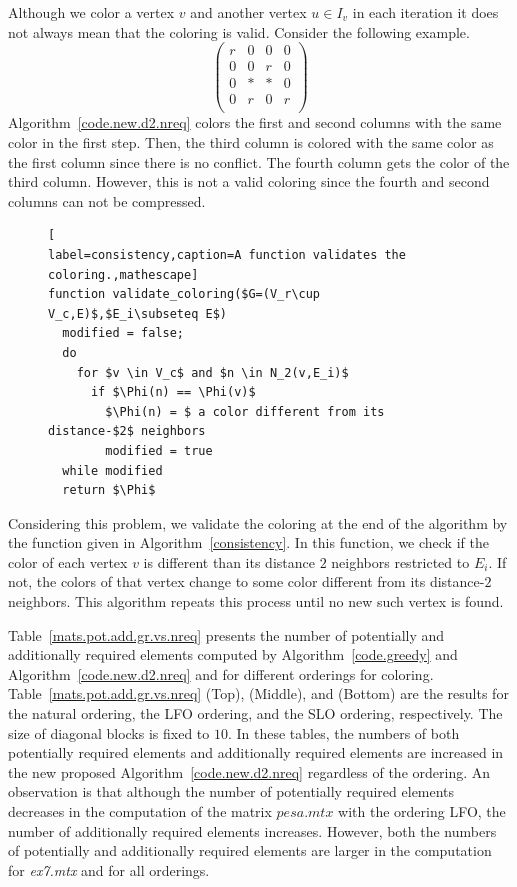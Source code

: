 \documentclass[12pt, twoside,a4paper,toc=bibliography]{scrbook}
\newcommand{\coderef}[1]{Algorithm~\protect\ref{#1}}
\begin{document}
Although we color a vertex $v$ and another vertex $u\in I_v$ in each iteration
it does not always mean that the coloring is valid. Consider the following example.
\begin{equation}
\left(\begin{array}{cccc}
r & 0 & 0 & 0  \\
0 & 0 & r & 0 \\
0 & * & * & 0 \\
0 & r & 0 & r \\
\end{array}\right)
\label{twocolorings2}
\end{equation}
\coderef{code.new.d2.nreq} colors the first and second columns with the same color
in the first step. Then, the third column is colored with the same color as the
first column since there is no conflict. The fourth column gets the color of
the third column. However, this is not a valid coloring
since the fourth and second columns can not be compressed.
\begin{figure}
\begin{lstlisting}[
label=consistency,caption=A function validates the coloring.,mathescape]
function validate_coloring($G=(V_r\cup V_c,E)$,$E_i\subseteq E$)
  modified = false;
  do
    for $v \in V_c$ and $n \in N_2(v,E_i)$
      if $\Phi(n) == \Phi(v)$
        $\Phi(n) = $ a color different from its distance-$2$ neighbors
        modified = true
  while modified
  return $\Phi$
\end{lstlisting}
\end{figure}
Considering this problem, we validate the coloring at the end of the algorithm
by the function given in \coderef{consistency}.
In this function, we check if the color of each vertex $v$ is different than its distance $2$ neighbors restricted
 to $E_i$.
If not, the colors of that vertex change to some color different from its distance-$2$ neighbors.
This algorithm repeats this process until no new such vertex is found.

Table~\ref{mats.pot.add.gr.vs.nreq} presents the number of potentially
and additionally required elements computed
by \coderef{code.greedy} and \coderef{code.new.d2.nreq}
and for different orderings for coloring.
Table~\ref{mats.pot.add.gr.vs.nreq} (Top), (Middle), and (Bottom) are
the results for the natural ordering, the LFO ordering, and the SLO ordering, respectively.
The size of diagonal blocks is fixed to $10$.
In these tables, the numbers of both potentially required elements and additionally required elements 
are increased in the new proposed \coderef{code.new.d2.nreq} regardless of the ordering.
An observation is that although the number of potentially required elements decreases 
in the computation of the matrix $pesa.mtx$ with the ordering LFO,
the number of additionally required elements increases. However,
both the numbers of potentially and additionally required elements
are larger in the computation for \textit{ex7.mtx} and for all orderings.
\end{document}
